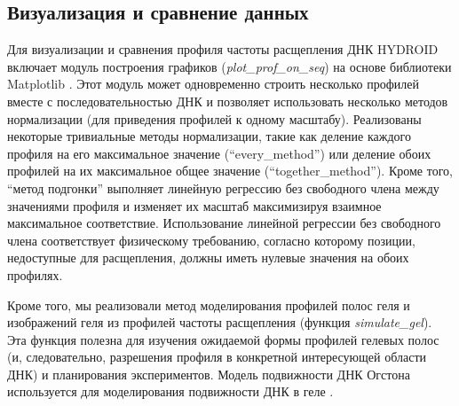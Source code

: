     
    \subsection{Визуализация и сравнение данных}
    
    Для визуализации и сравнения профиля частоты расщепления ДНК HYDROID включает модуль построения графиков (\textit{plot\_prof\_on\_seq}) на основе библиотеки Matplotlib \cite{hunter_matplotlib_2007}. Этот модуль может одновременно строить несколько профилей вместе с последовательностью ДНК и позволяет использовать несколько методов нормализации (для приведения профилей к одному масштабу). Реализованы некоторые тривиальные методы нормализации, такие как деление каждого профиля на его максимальное значение (``every\_method'') или деление обоих профилей на их максимальное общее значение (``together\_method''). Кроме того, ``метод подгонки'' выполняет линейную регрессию без свободного члена между значениями профиля и изменяет их масштаб максимизируя взаимное максимальное соответствие. Использование линейной регрессии без свободного члена соответствует физическому требованию, согласно которому позиции, недоступные для расщепления, должны иметь нулевые значения на обоих профилях.

    Кроме того, мы реализовали метод моделирования профилей полос геля и изображений геля из профилей частоты расщепления (функция \textit{simulate\_gel}). Эта функция полезна для изучения ожидаемой формы профилей гелевых полос (и, следовательно, разрешения профиля в конкретной интересующей области ДНК) и планирования экспериментов. Модель подвижности ДНК Огстона используется для моделирования подвижности ДНК в геле \cite{slater_dna_2001}.
    


